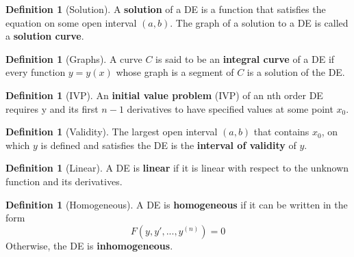 \documentclass[12pt]{article}
\theoremstyle{definition}
\newtheorem{defn}[thm]{Definition}
\theoremstyle{remark}
\numberwithin{equation}{section}
\newcommand\B[1]{\textbf{ #1}}
\begin{document}
\vspace{1cm}

\begin{defn}[Solution]
        A \B{solution} of a DE is a function that satisfies the equation on some open interval $(a,b)$. The graph of a solution to a DE is called a \B{solution curve}.
\end{defn}


\vspace{1cm}



\begin{defn}[Graphs]
        A curve $C$ is said to be an \B{integral curve} of a DE if every function $y = y(x)$ whose graph is a segment of $C$ is a solution of the DE.
\end{defn}


\vspace{1cm}


\begin{defn}[IVP]
        An \B{initial value problem} (IVP) of an nth order DE requires y and its first $n-1$ derivatives to have specified values at some point $x_0$.
\end{defn}


\vspace{1cm}



\begin{defn}[Validity]
        The largest open interval $(a,b)$ that contains $x_0$, on which $y$ is defined and satisfies the DE is the \B{interval of validity} of $y$.
\end{defn}



\vspace{1cm}


\begin{defn}[Linear]
        A DE is \B{linear} if it is linear with respect to the unknown function and its derivatives.
\end{defn}


\vspace{1cm}


\begin{defn}[Homogeneous]
        A DE is \B{homogeneous} if it can be written in the form \begin{equation}
                F(y,y',...,y^{(n)}) = 0
        \end{equation}
        Otherwise, the DE is \B{inhomogeneous}.
\end{defn}
\end{document}

